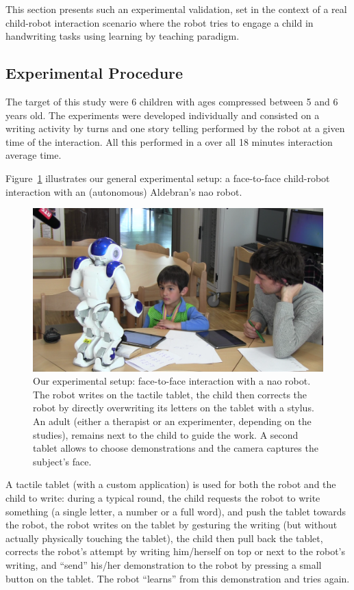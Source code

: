 \documentclass{sig-alternate}
\begin{document}
This section presents such an experimental validation, set in the context of a
real child-robot interaction scenario where the robot tries to engage a child in
handwriting tasks using learning by teaching paradigm.

\subsection{Experimental Procedure}

The target of this study were 6 children with ages compressed between 5 and 6
years old. The experiments were developed individually and consisted on a
writing activity by turns and one story telling performed by the robot at a
given time of the interaction. All this performed in a over all 18 minutes
interaction average time.

Figure~\ref{fig:realSetup} illustrates our general experimental setup: a
face-to-face child-robot interaction with an (autonomous) Aldebran's {\sc nao}
robot.

\begin{figure}[h!]
    \centering
    \includegraphics[width=1\columnwidth]{realSetup}
    \caption{\small Our experimental setup: face-to-face interaction with a {\sc
            nao} robot.  The robot writes on the tactile tablet, the child then
            corrects the robot by directly overwriting its letters on the tablet
            with a stylus. An adult (either a therapist or an experimenter,
            depending on the studies), remains next to the child to guide the work. 
            A second tablet allows to choose demonstrations and the camera captures the subject's face.}
    \label{fig:realSetup}
\end{figure}

A tactile tablet (with a custom application) is used for both the robot and the
child to write: during a typical round, the child requests the robot to write
something (a single letter, a number or a full word), and push the tablet
towards the robot, the robot writes on the tablet by gesturing the writing (but
without actually physically touching the tablet), the child then pull back the
tablet, corrects the robot's attempt by writing him/herself on top or next to
the robot's writing, and ``send'' his/her demonstration to the robot by pressing
a small button on the tablet. The robot ``learns'' from this demonstration and
tries again.
\end{document}
